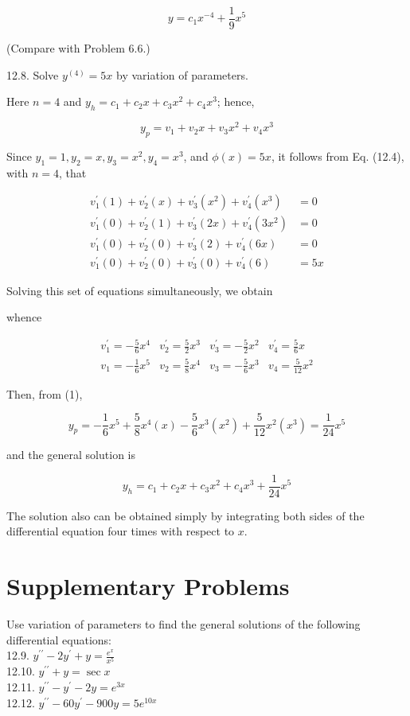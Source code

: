 \documentclass[10pt]{article}
\begin{document}
$$
y=c_{1} x^{-4}+\frac{1}{9} x^{5}
$$

(Compare with Problem 6.6.)

12.8. Solve $y^{(4)}=5 x$ by variation of parameters.

Here $n=4$ and $y_{h}=c_{1}+c_{2} x+c_{3} x^{2}+c_{4} x^{3}$; hence,


\begin{equation*}
y_{p}=v_{1}+v_{2} x+v_{3} x^{2}+v_{4} x^{3} \tag{1}
\end{equation*}


Since $y_{1}=1, y_{2}=x, y_{3}=x^{2}, y_{4}=x^{3}$, and $\phi(x)=5 x$, it follows from Eq. (12.4), with $n=4$, that

$$
\begin{aligned}
v_{1}^{\prime}(1)+v_{2}^{\prime}(x)+v_{3}^{\prime}\left(x^{2}\right)+v_{4}^{\prime}\left(x^{3}\right) & =0 \\
v_{1}^{\prime}(0)+v_{2}^{\prime}(1)+v_{3}^{\prime}(2 x)+v_{4}^{\prime}\left(3 x^{2}\right) & =0 \\
v_{1}^{\prime}(0)+v_{2}^{\prime}(0)+v_{3}^{\prime}(2)+v_{4}^{\prime}(6 x) & =0 \\
v_{1}^{\prime}(0)+v_{2}^{\prime}(0)+v_{3}^{\prime}(0)+v_{4}^{\prime}(6) & =5 x
\end{aligned}
$$

Solving this set of equations simultaneously, we obtain

whence

$$
\begin{array}{llll}
v_{1}^{\prime}=-\frac{5}{6} x^{4} & v_{2}^{\prime}=\frac{5}{2} x^{3} & v_{3}^{\prime}=-\frac{5}{2} x^{2} & v_{4}^{\prime}=\frac{5}{6} x \\
v_{1}=-\frac{1}{6} x^{5} & v_{2}=\frac{5}{8} x^{4} & v_{3}=-\frac{5}{6} x^{3} & v_{4}=\frac{5}{12} x^{2}
\end{array}
$$

Then, from (1),

$$
y_{p}=-\frac{1}{6} x^{5}+\frac{5}{8} x^{4}(x)-\frac{5}{6} x^{3}\left(x^{2}\right)+\frac{5}{12} x^{2}\left(x^{3}\right)=\frac{1}{24} x^{5}
$$

and the general solution is

$$
y_{h}=c_{1}+c_{2} x+c_{3} x^{2}+c_{4} x^{3}+\frac{1}{24} x^{5}
$$

The solution also can be obtained simply by integrating both sides of the differential equation four times with respect to $x$.

\section*{Supplementary Problems}
Use variation of parameters to find the general solutions of the following differential equations:\\
12.9. $y^{\prime \prime}-2 y^{\prime}+y=\frac{e^{x}}{x^{5}}$\\
12.10. $y^{\prime \prime}+y=\sec x$\\
12.11. $y^{\prime \prime}-y^{\prime}-2 y=e^{3 x}$\\
12.12. $y^{\prime \prime}-60 y^{\prime}-900 y=5 e^{10 x}$
\end{document}

